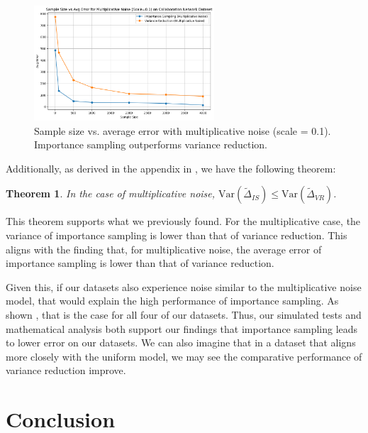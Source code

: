 \documentclass[11pt, margin=1in]{article}
\newtheorem{theorem}{Theorem}
\begin{document}
\begin{figure}[H]
    \centering
    \includegraphics[width=0.6\textwidth]{plots/simulated/percent_error_vs_sample_size_comparison_multiplicative_0.1.png}
    \caption{Sample size vs. average error with multiplicative noise (scale = 0.1). Importance sampling outperforms variance reduction.}
    \label{fig:multiplicative_noise_01}
\end{figure}

Additionally, as derived in the appendix in , we have the following theorem:

\begin{theorem}
\label{theorem:variance-comparison}
In the case of multiplicative noise, $\mathrm{Var}(\tilde{\Delta}_{IS}) \leq \mathrm{Var}(\tilde{\Delta}_{VR})$.
\end{theorem}

This theorem supports what we previously found.
For the multiplicative case, the variance of importance sampling is lower than that of variance reduction.
This aligns with the finding that, for multiplicative noise, the average error of importance sampling is lower than that of variance reduction.

Given this, if our datasets also experience noise similar to the multiplicative noise model, that would explain the high performance of importance sampling.
As shown , that is the case for all four of our datasets. 
Thus, our simulated tests and mathematical analysis both support our findings that importance sampling leads to lower error on our datasets.
We can also imagine that in a dataset that aligns more closely with the uniform model, we may see the comparative performance of variance reduction improve.

\newpage

\section{Conclusion}
\end{document}
